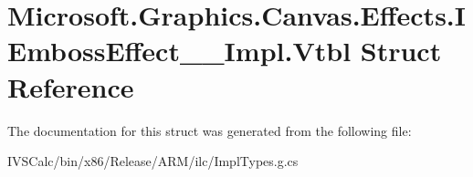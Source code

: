 \hypertarget{struct_microsoft_1_1_graphics_1_1_canvas_1_1_effects_1_1_i_emboss_effect_____impl_1_1_vtbl}{}\section{Microsoft.\+Graphics.\+Canvas.\+Effects.\+I\+Emboss\+Effect\+\_\+\+\_\+\+Impl.\+Vtbl Struct Reference}
\label{struct_microsoft_1_1_graphics_1_1_canvas_1_1_effects_1_1_i_emboss_effect_____impl_1_1_vtbl}


The documentation for this struct was generated from the following file\+:\begin{DoxyCompactItemize}
\item 
I\+V\+S\+Calc/bin/x86/\+Release/\+A\+R\+M/ilc/Impl\+Types.\+g.\+cs\end{DoxyCompactItemize}
